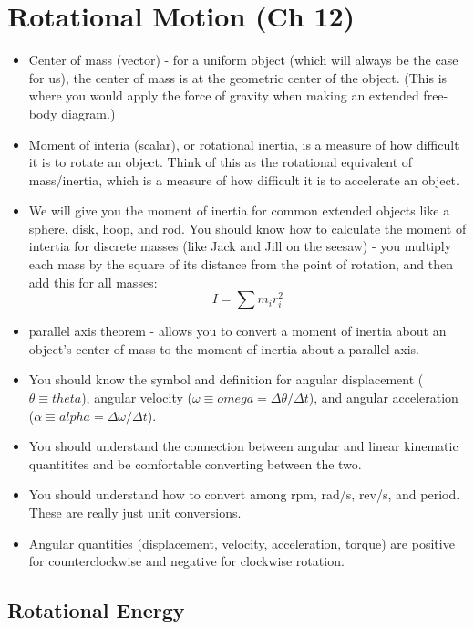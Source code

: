 \section{Rotational Motion (Ch 12)}
\vspace*{-.15in}
\begin{itemize}
\item Center of mass (vector) - for a uniform object (which will
  always be the case for us), the center of mass is at the geometric
  center of the object.  (This is where you would apply the force of
  gravity when making an extended free-body diagram.)
\item Moment of interia (scalar), or rotational inertia, is a measure
  of how difficult it is to rotate an object.  Think of this as the
  rotational equivalent of mass/inertia, which is a measure of how
  difficult it is to accelerate an object.
\item We will give you the moment of inertia for common extended
  objects like a sphere, disk, hoop, and rod.  You should know how to
  calculate the moment of intertia for discrete masses (like Jack and
  Jill on the seesaw) - you multiply each mass by the square of its distance from
  the point of rotation, and then add this for all masses:
\begin{equation}
I = \sum m_i r_i^2
\end{equation}
\item parallel axis theorem - allows you to convert a moment of
  inertia about an object's center of mass to the moment of inertia
  about a parallel axis.
\item You should know the symbol and definition for angular
  displacement ($\theta \equiv theta$), angular velocity ($\omega
  \equiv omega = \Delta \theta/\Delta t$), and angular acceleration
  ($\alpha \equiv alpha = \Delta \omega /\Delta t$).
\item You should understand the connection between angular and linear kinematic
  quantitites and be comfortable converting between the two.
\item You should understand how to convert among rpm, rad/s, rev/s,
  and period.  These are really just unit conversions.
\item Angular quantities (displacement, velocity, acceleration, torque) are
  positive for counterclockwise and negative for clockwise rotation.

\end{itemize}

\subsection{Rotational Energy}

